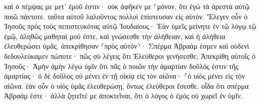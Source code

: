 \documentclass{openreader}
\begin{document}
καὶ ὁ πέμψας με μετ’ ἐμοῦ ἐστιν· οὐκ ἀφῆκέν με ⸀μόνον, ὅτι ἐγὼ τὰ ἀρεστὰ αὐτῷ ποιῶ πάντοτε. 
ταῦτα αὐτοῦ λαλοῦντος πολλοὶ ἐπίστευσαν εἰς αὐτόν. 
Ἔλεγεν οὖν ὁ Ἰησοῦς πρὸς τοὺς πεπιστευκότας αὐτῷ Ἰουδαίους· Ἐὰν ὑμεῖς μείνητε ἐν τῷ λόγῳ τῷ ἐμῷ, ἀληθῶς μαθηταί μού ἐστε, 
καὶ γνώσεσθε τὴν ἀλήθειαν, καὶ ἡ ἀλήθεια ἐλευθερώσει ὑμᾶς. 
ἀπεκρίθησαν ⸂πρὸς αὐτόν⸃· Σπέρμα Ἀβραάμ ἐσμεν καὶ οὐδενὶ δεδουλεύκαμεν πώποτε· πῶς σὺ λέγεις ὅτι Ἐλεύθεροι γενήσεσθε; 
Ἀπεκρίθη αὐτοῖς ὁ Ἰησοῦς· Ἀμὴν ἀμὴν λέγω ὑμῖν ὅτι πᾶς ὁ ποιῶν τὴν ἁμαρτίαν δοῦλός ἐστιν τῆς ἁμαρτίας· 
ὁ δὲ δοῦλος οὐ μένει ἐν τῇ οἰκίᾳ εἰς τὸν αἰῶνα· ⸀ὁ υἱὸς μένει εἰς τὸν αἰῶνα. 
ἐὰν οὖν ὁ υἱὸς ὑμᾶς ἐλευθερώσῃ, ὄντως ἐλεύθεροι ἔσεσθε. 
οἶδα ὅτι σπέρμα Ἀβραάμ ἐστε· ἀλλὰ ζητεῖτέ με ἀποκτεῖναι, ὅτι ὁ λόγος ὁ ἐμὸς οὐ χωρεῖ ἐν ὑμῖν. 
\end{document}
